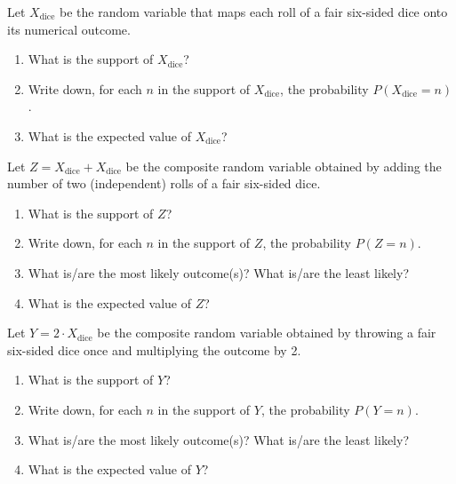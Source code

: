 \documentclass[nobib,nofonts]{tufte-handout}
\newcommand{\mult}{\ensuremath{\cdot}}
\begin{document}
\bigskip
\noindent \colorbox{mygray}{\centering
  \begin{minipage}{1.0\textwidth}

    \begin{exercise}
      Let $X_{\text{dice}}$ be the random variable that maps each roll of a fair six-sided dice onto its numerical outcome.
      \begin{enumerate}
        \item What is the support of $X_{\text{dice}}$?
        \item Write down, for each $n$ in the support of $X_{\text{dice}}$, the probability $P(X_{\text{dice}}=n)$.
        \item What is the expected value of $X_{\text{dice}}$?
      \end{enumerate}
    \end{exercise}

    \begin{exercise}
      Let $Z = X_{\text{dice}} + X_{\text{dice}}$ be the composite random variable obtained by adding the number of two (independent) rolls of a fair six-sided dice.
      \begin{enumerate}
        \item What is the support of $Z$?
        \item Write down, for each $n$ in the support of $Z$, the probability $P(Z=n)$.
        \item What is/are the most likely outcome(s)? What is/are the least likely?
        \item What is the expected value of $Z$?
      \end{enumerate}
    \end{exercise}

    \begin{exercise}
      Let $Y = 2 \mult X_{\text{dice}}$ be the composite random variable obtained by throwing a fair six-sided dice once and multiplying the outcome by 2.
      \begin{enumerate}
        \item What is the support of $Y$?
        \item Write down, for each $n$ in the support of $Y$, the probability $P(Y=n)$.
        \item What is/are the most likely outcome(s)? What is/are the least likely?
        \item What is the expected value of $Y$?
      \end{enumerate}
    \end{exercise}

  \end{minipage}
}

\end{document}

